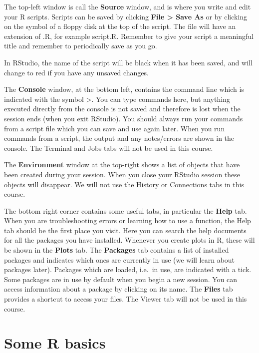 \documentclass[
]{memoir}
\begin{document}
The top-left window is call the \textbf{Source} window, and is where you write and edit your R scripts. Scripts can be saved by clicking \textbf{File \textgreater{} Save As} or by clicking on the symbol of a floppy disk at the top of the script. The file will have an extension of .R, for example script.R. Remember to give your script a meaningful title and remember to periodically save as you go.

In RStudio, the name of the script will be black when it has been saved, and will change to red if you have any unsaved changes.

The \textbf{Console} window, at the bottom left, contains the command line which is indicated with the symbol \textgreater. You can type commands here, but anything executed directly from the console is not saved and therefore is lost when the session ends (when you exit RStudio). You should always run your commands from a script file which you can save and use again later. When you run commands from a script, the output and any notes/errors are shown in the console. The Terminal and Jobs tabs will not be used in this course.

The \textbf{Environment} window at the top-right shows a list of objects that have been created during your session. When you close your RStudio session these objects will disappear. We will not use the History or Connections tabs in this course.

The bottom right corner contains some useful tabs, in particular the \textbf{Help} tab. When you are troubleshooting errors or learning how to use a function, the Help tab should be the first place you visit. Here you can search the help documents for all the packages you have installed. Whenever you create plots in R, these will be shown in the \textbf{Plots} tab. The \textbf{Packages} tab contains a list of installed packages and indicates which ones are currently in use (we will learn about packages later). Packages which are loaded, i.e.~in use, are indicated with a tick. Some packages are in use by default when you begin a new session. You can access information about a package by clicking on its name. The \textbf{Files} tab provides a shortcut to access your files. The Viewer tab will not be used in this course.

\hypertarget{some-r-basics}{%
\section{Some R basics}\label{some-r-basics}}
\end{document}
